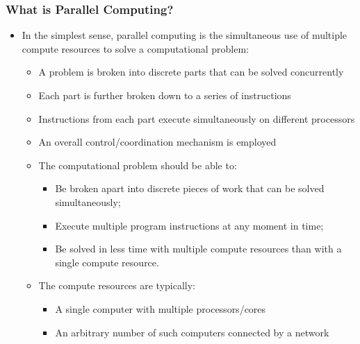 \documentclass[10pt,t]{beamer}
\begin{document}
\begin{frame}
\frametitle{What is Parallel Computing?}
\begin{itemize}
\item In the simplest sense, parallel computing is the simultaneous use of multiple compute resources to solve a computational problem:
\begin{itemize}
\item A problem is broken into discrete parts that can be solved concurrently
\item Each part is further broken down to a series of instructions
\item Instructions from each part execute simultaneously on different processors
\item An overall control/coordination mechanism is employed
\item The computational problem should be able to:
\begin{itemize}
\item Be broken apart into discrete pieces of work that can be solved simultaneously;
\item Execute multiple program instructions at any moment in time;
\item Be solved in less time with multiple compute resources than with a single compute resource.
\end{itemize}
\item The compute resources are typically:
\begin{itemize}
\item A single computer with multiple processors/cores
\item An arbitrary number of such computers connected by a network
\end{itemize}
\end{itemize}
\end{itemize}
\end{frame}
\end{document}
